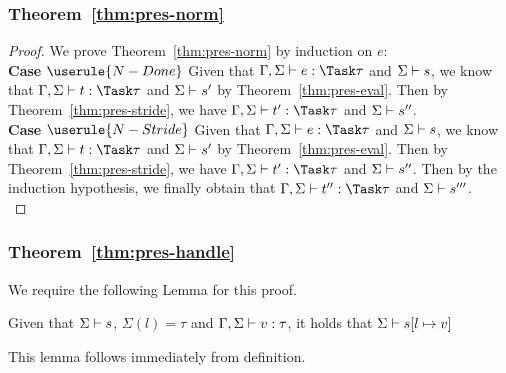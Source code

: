 \subsubsection{Theorem~\ref{thm:pres-norm}}

\begin{proof}
  We prove Theorem~\ref{thm:pres-norm} by induction on $e$:\\

  \noindent\textbf{Case} $\userule{N-Done}$ Given that
  $\Gamma,\Sigma\infers e:\Task\tau$ and $\Sigma\vdash s$, we know that
  $\Gamma,\Sigma\infers t:\Task\tau$ and $\Sigma\vdash s'$ by
  Theorem~\ref{thm:pres-eval}. Then by Theorem~\ref{thm:pres-stride}, we have
  $\Gamma,\Sigma\infers t':\Task\tau$ and $\Sigma\vdash s''$.\\

  \noindent\textbf{Case} $\userule{N-Stride}$ Given that
  $\Gamma,\Sigma\infers e:\Task\tau$ and $\Sigma\vdash s$, we know that
  $\Gamma,\Sigma\infers t:\Task\tau$ and $\Sigma\vdash s'$ by
  Theorem~\ref{thm:pres-eval}. Then by Theorem~\ref{thm:pres-stride}, we have
  $\Gamma,\Sigma\infers t':\Task\tau$ and $\Sigma\vdash s''$. Then by the
  induction hypothesis, we finally obtain that
  $\Gamma,\Sigma\infers t'':\Task\tau$ and $\Sigma\vdash s'''$.\\

\end{proof}

\subsubsection{Theorem~\ref{thm:pres-handle}}

We require the following Lemma for this proof.

\begin{lemma}
  Given that $\Sigma\vdash s$, $\Sigma(l)=\tau$ and $\Gamma,\Sigma\vdash v:\tau$, it holds that $\Sigma\vdash s[l\mapsto v]$
  \label{lemmasigmaconsistent}
\end{lemma}
This lemma follows immediately from definition.

